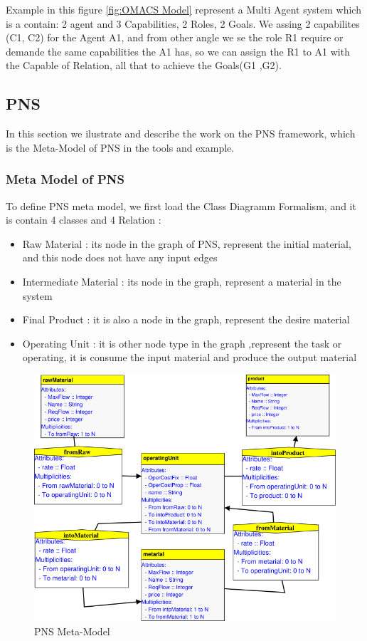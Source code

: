 Example in this figure \ref{fig:OMACS Model} represent a Multi Agent system which is a contain: 2 agent and 3 Capabilities, 2 Roles, 2 Goals.
We assing 2 capabilites (C1, C2) for the Agent A1, and from other angle we se the role R1 require or demande the same capabilities the A1 has, so we can assign the R1 to A1 with the Capable of Relation, all that to achieve the Goals(G1 ,G2). 

\subsection{PNS} 

In this section we ilustrate and describe the work on the PNS framework, which is the Meta-Model of PNS in the tools and example. 
\subsubsection{Meta Model of PNS}
To define PNS meta model, we first load the Class Diagramm Formalism, and it is contain 4 classes and 4 Relation : 
\begin{itemize}

\newcommand{\localtextbulletone}{\textcolor{gray}{\raisebox{.45ex}{\rule{.6ex}{.6ex}}}}
\renewcommand{\labelitemi}{\localtextbulletone}
	\item Raw Material : its node in the graph of PNS, represent the initial material, and this node does not have any input edges 
	\item Intermediate Material : its node in the graph, represent a material in the system
	\item Final Product : it is also a node in the graph, represent the desire material 
	\item Operating Unit : it is other node type in the graph  ,represent the task or operating, it is consume the input material and produce the output material 
\end{itemize}
\pagebreak
\begin{figure}[th] 

	\centering
 	\includegraphics[scale=0.7]{ch3/img/pns_meta}
	\caption{\label{fig:PNS Meta-Model}PNS Meta-Model}
	
\end{figure} 


